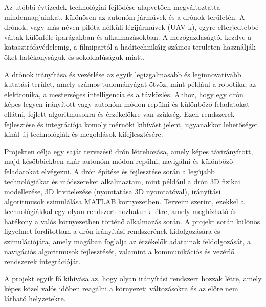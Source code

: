 Az utóbbi évtizedek technológiai fejlődése alapvetően megváltoztatta mindennapjainkat, különösen az autonóm járművek és a drónok területén. A drónok, vagy más néven pilóta nélküli légijárművek (UAV-k), egyre elterjedtebbé váltak különféle iparágakban és alkalmazásokban. A mezőgazdaságtól kezdve a katasztrófavédelemig, a filmipartól a haditechnikáig számos területen használják őket hatékonyságuk és sokoldalúságuk miatt.

A drónok irányítása és vezérlése az egyik legizgalmasabb és leginnovatívabb kutatási terület, amely számos tudományágat ötvöz, mint például a robotika, az elektronika, a mesterséges intelligencia és a távközlés. Ahhoz, hogy egy drón képes legyen irányított vagy autonóm módon repülni és különböző feladatokat ellátni, fejlett algoritmusokra és érzékelőkre van szükség. Ezen rendszerek fejlesztése és integrációja komoly mérnöki kihívást jelent, ugyanakkor lehetőséget kínál új technológiák és megoldások kifejlesztésére.

Projekten célja egy saját tervezésű drón létrehozása, amely képes távirányított, majd későbbiekben akár autonóm módon repülni, navigálni és különböző feladatokat elvégezni. A drón építése és fejlesztése során a legújabb technológiákat és módszereket alkalmaztam, mint például a drón 3D fizikai modellezése, 3D kivitelezése (nyomtatása 3D nyomtatóval), irányítási algoritmusok szimulálása MATLAB környezetben. Terveim szerint, ezekkel a technológiákkal egy olyan rendszert hozhatunk létre, amely megbízható és hatékony a valós környezetben történő alkalmazás során. A projekt során különös figyelmet fordítottam a drón irányítási rendszerének kidolgozására és szimulációjára, amely magában foglalja az érzékelők adatainak feldolgozását, a navigációs algoritmusok fejlesztését, valamint a kommunikációs és vezérlő rendszerek integrációját.

A projekt egyik fő kihívása az, hogy olyan irányítási rendszert hozzak létre, amely képes közel valós időben reagálni a környezeti változásokra és az előre nem látható helyzetekre. 

